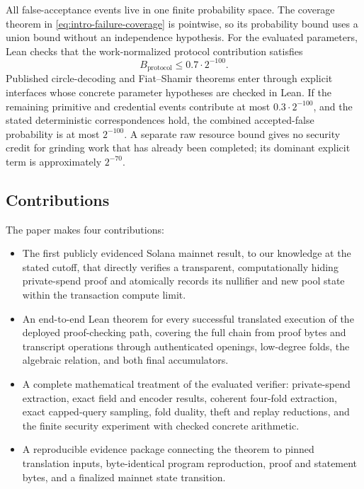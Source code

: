 All false-acceptance events live in one finite probability space.  The
coverage theorem in \cref{eq:intro-failure-coverage} is pointwise, so its
probability bound uses a union bound without an independence hypothesis.
For the evaluated parameters, Lean checks that the work-normalized protocol
contribution satisfies
\[
  B_{\mathrm{protocol}}\leq 0.7\cdot2^{-100}.
\]
Published circle-decoding and Fiat--Shamir theorems enter through explicit
interfaces whose concrete parameter hypotheses are checked in Lean.  If the
remaining primitive and credential events contribute at most
\(0.3\cdot2^{-100}\), and the stated deterministic correspondences hold, the
combined accepted-false probability is at most \(2^{-100}\).  A separate raw
resource bound gives no security credit for grinding work that has already
been completed; its dominant explicit term is approximately \(2^{-70}\).

\subsection{Contributions}

The paper makes four contributions:
\begin{itemize}[leftmargin=*]
  \item The first publicly evidenced Solana mainnet result, to our knowledge
        at the stated cutoff, that directly verifies a transparent,
        computationally hiding private-spend proof and atomically records its
        nullifier and new pool state within the transaction compute limit.
  \item An end-to-end Lean theorem for every successful translated execution
        of the deployed proof-checking path, covering the full chain from
        proof bytes and transcript operations through authenticated openings,
        low-degree folds, the algebraic relation, and both final accumulators.
  \item A complete mathematical treatment of the evaluated verifier:
        private-spend extraction, exact field and encoder results, coherent
        four-fold extraction, exact capped-query sampling, fold duality,
        theft and replay reductions, and the finite security experiment with
        checked concrete arithmetic.
  \item A reproducible evidence package connecting the theorem to pinned
        translation inputs, byte-identical program reproduction, proof and
        statement bytes, and a finalized mainnet state transition.
\end{itemize}

